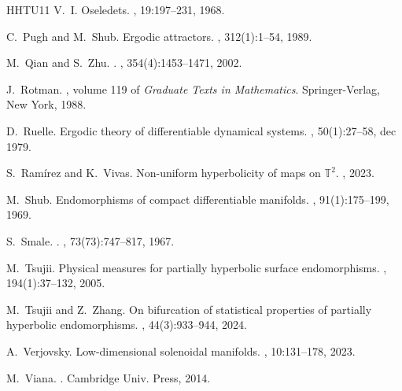 \documentclass[11pt,letterpaper,reqno]{article}
\begin{document}
\begin{thebibliography}{HHTU11}
V.~I. Oseledets.
, 19:197--231,
  1968.

C.~Pugh and M.~Shub.
\newblock Ergodic attractors.
,
  312(1):1--54, 1989.

M.~Qian and S.~Zhu.
.
,
  354(4):1453--1471, 2002.

J.~Rotman.
, volume 119 of {\em
  Graduate Texts in Mathematics}.
\newblock Springer-Verlag, New York, 1988.

D.~Ruelle.
\newblock Ergodic theory of differentiable dynamical systems.
, 50(1):27--58, dec 1979.

S.~Ramírez and K.~Vivas.
\newblock Non-uniform hyperbolicity of maps on $\mathbb{T}^2$.
, 2023.

M.~Shub.
\newblock Endomorphisms of compact differentiable manifolds.
, 91(1):175--199, 1969.

S.~Smale.
.
, 73(73):747--817, 1967.

M.~Tsujii.
\newblock Physical measures for partially hyperbolic surface endomorphisms.
, 194(1):37--132, 2005.

M.~Tsujii and Z.~Zhang.
\newblock On bifurcation of statistical properties of partially hyperbolic
  endomorphisms.
, 44(3):933–944, 2024.

A.~Verjovsky.
\newblock Low-dimensional solenoidal manifolds.
, 10:131--178, 2023.

M.~Viana.
.
\newblock Cambridge Univ. Press, 2014.


\end{thebibliography}
\end{document}
